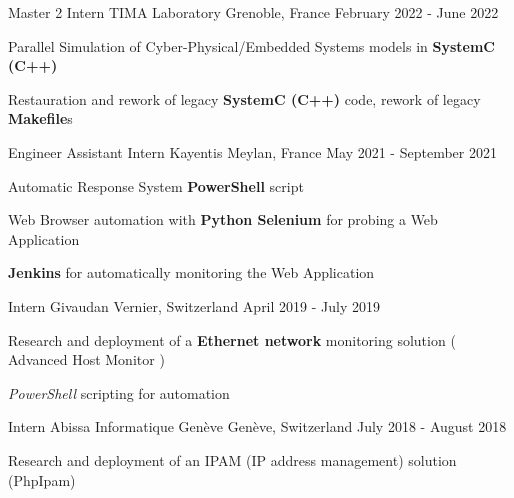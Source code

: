\begin{cventries}
	\cventry
	{Master 2 Intern} %
	{TIMA Laboratory} %
	{Grenoble, France} %
	{February 2022 - June 2022} %
	{
		\begin{cvitems} %
		\item{Parallel Simulation of Cyber-Physical/Embedded Systems models in \textbf{SystemC (C++)}}
		\item {Restauration and rework of legacy \textbf{SystemC (C++)} code, rework of legacy \textbf{Makefile}s}		
		\end{cvitems}
	}

	\cventry
	{Engineer Assistant Intern} %
	{Kayentis} %
	{Meylan, France} %
	{May 2021 - September 2021} %
	{
		\begin{cvitems} %
		\item {Automatic Response System \textbf{PowerShell} script}
		\item {Web Browser automation with \textbf{Python Selenium} for probing a Web Application}
		\item {\textbf{Jenkins} for automatically monitoring the Web Application}
		\end{cvitems}
	}

	\cventry
	{Intern} %
	{Givaudan} %
	{Vernier, Switzerland} %
	{April 2019 - July 2019} %
	{
		\begin{cvitems} %
		\item {Research and deployment of a \textbf{Ethernet network} monitoring solution ( Advanced Host Monitor )}
		\item {\emph{PowerShell} scripting for automation}
		\end{cvitems}
	}

	\cventry
	{Intern} %
	{Abissa Informatique Genève} %
	{Genève, Switzerland} %
	{July 2018 - August 2018} %
	{
		\begin{cvitems} %
		\item {Research and deployment of an IPAM (IP address management) solution (PhpIpam)}
		\end{cvitems}
	}
\end{cventries}
